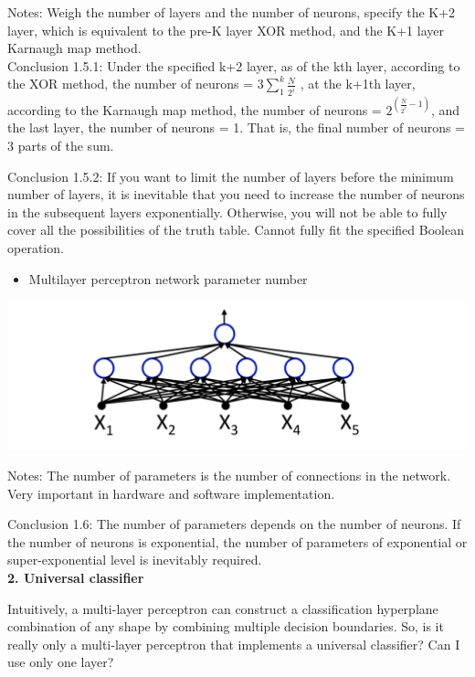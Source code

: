 \documentclass{article}
\begin{document}
	Notes: Weigh the number of layers and the number of neurons, specify the K+2 layer, which is equivalent to the pre-K layer XOR method, and the K+1 layer Karnaugh map method. \\
	
	Conclusion 1.5.1: Under the specified k+2 layer, as of the kth layer, according to the XOR method, the number of neurons = $3\sum_{1}^{k}{\frac{N}{2^i}}$ , at the k+1th layer, according to the Karnaugh map method, the number of neurons = $2^{(\frac{N}{2^i}-1)}$, and the last layer, the number of neurons = 1. That is, the final number of neurons = 3 parts of the sum.
	
	Conclusion 1.5.2: If you want to limit the number of layers before the minimum number of layers, it is inevitable that you need to increase the number of neurons in the subsequent layers exponentially. Otherwise, you will not be able to fully cover all the possibilities of the truth table. Cannot fully fit the specified Boolean operation.
	
	\begin{itemize}
		\item Multilayer perceptron network parameter number
	\end{itemize}
	
	\includegraphics[scale=0.2]{23.png}
	
	Notes: The number of parameters is the number of connections in the network. Very important in hardware and software implementation.
	
	Conclusion 1.6: The number of parameters depends on the number of neurons. If the number of neurons is exponential, the number of parameters of exponential or super-exponential level is inevitably required. \\ 
	
	
	
	\textbf{2. Universal classifier}
	
	Intuitively, a multi-layer perceptron can construct a classification hyperplane combination of any shape by combining multiple decision boundaries. So, is it really only a multi-layer perceptron that implements a universal classifier? Can I use only one layer?
	
\end{document}
